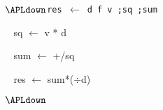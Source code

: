 {\tt $\APLdown$res $\leftarrow$ d f v ;sq ;sum

$\;\;$  sq $\leftarrow$ v * d

$\;\;$  sum $\leftarrow$ +/sq

$\;\;$  res $\leftarrow$ sum*($\div$d)

$\APLdown$}




\copyrightnotice

\bye

